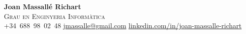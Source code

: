 \documentclass[11pt,a4paper]{article}
\begin{document}
\begin{center}
    
    {\Huge \color{primary} \textbf{Joan Massallé Richart}} \\
    \vspace{3pt}
    {\Large \color{subheadings} \textsc{Grau en Enginyeria Informàtica}} \\
    \vspace{8pt}
    \color{headings}
    \faPhone \space +34~688~98~02~48 \space \textbullet \space
    \vspace{2pt}
    \faEnvelope \space \href{mailto:jmassalle@gmail.com}{jmassalle@gmail.com} \space \textbullet \space
    \faLinkedin \space \href{https://www.linkedin.com/in/joan-massall%C3%A9-richart-a9064a287/}{linkedin.com/in/joan-massalle-richart} \\
\end{center}

\vspace{15pt}
\end{document}
